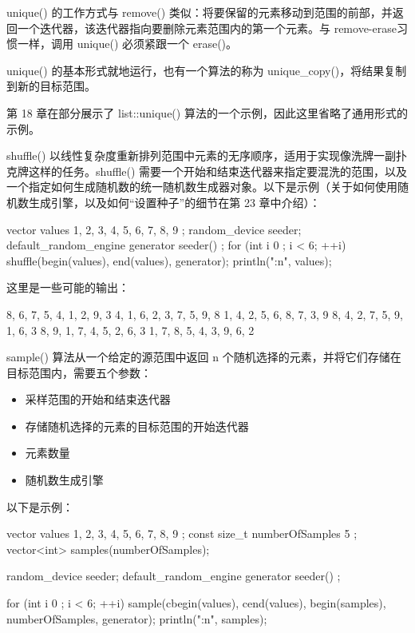 unique() 的工作方式与 remove() 类似：将要保留的元素移动到范围的前部，并返回一个迭代器，该迭代器指向要删除元素范围内的第一个元素。与 remove-erase习惯一样，调用 unique() 必须紧跟一个 erase()。

unique() 的基本形式就地运行，也有一个算法的称为 unique\_copy()，将结果复制到新的目标范围。

第 18 章在部分展示了 list::unique() 算法的一个示例，因此这里省略了通用形式的示例。


shuffle() 以线性复杂度重新排列范围中元素的无序顺序，适用于实现像洗牌一副扑克牌这样的任务。shuffle() 需要一个开始和结束迭代器来指定要混洗的范围，以及一个指定如何生成随机数的统一随机数生成器对象。以下是示例（关于如何使用随机数生成引擎，以及如何“设置种子”的细节在第 23 章中介绍）：

\begin{cpp}
vector values { 1, 2, 3, 4, 5, 6, 7, 8, 9 };
random_device seeder;
default_random_engine generator { seeder() };
for (int i { 0 }; i < 6; ++i) {
    shuffle(begin(values), end(values), generator);
    println("{:n}", values);
}
\end{cpp}

这里是一些可能的输出：

\begin{shell}
8, 6, 7, 5, 4, 1, 2, 9, 3
4, 1, 6, 2, 3, 7, 5, 9, 8
1, 4, 2, 5, 6, 8, 7, 3, 9
8, 4, 2, 7, 5, 9, 1, 6, 3
8, 9, 1, 7, 4, 5, 2, 6, 3
1, 7, 8, 5, 4, 3, 9, 6, 2
\end{shell}



sample() 算法从一个给定的源范围中返回 n 个随机选择的元素，并将它们存储在目标范围内，需要五个参数：

\begin{itemize}
\item
采样范围的开始和结束迭代器

\item
存储随机选择的元素的目标范围的开始迭代器

\item
元素数量

\item
随机数生成引擎
\end{itemize}

以下是示例：

\begin{cpp}
vector values { 1, 2, 3, 4, 5, 6, 7, 8, 9 };
const size_t numberOfSamples { 5 };
vector<int> samples(numberOfSamples);

random_device seeder;
default_random_engine generator { seeder() };

for (int i { 0 }; i < 6; ++i) {
    sample(cbegin(values), cend(values), begin(samples),
        numberOfSamples, generator);
    println("{:n}", samples);
}
\end{cpp}

